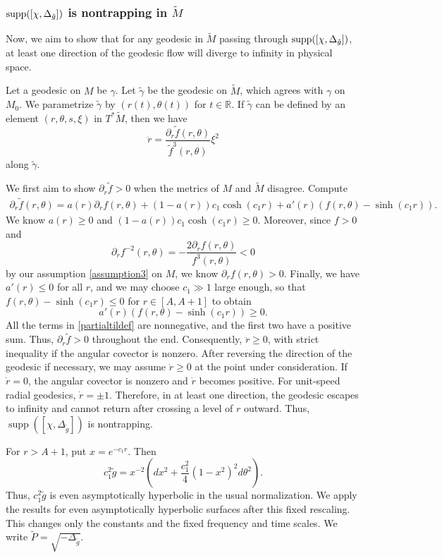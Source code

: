 \documentclass[11pt]{amsart}
\begin{document}
\subsubsection{$\textnormal{supp}([\chi,\Delta_{\tilde g}])$ is nontrapping in $\tilde M$} Now, we aim to show that for any geodesic in $\tilde M$ passing through $\textnormal{supp}([\chi,\Delta_{\tilde g}])$, at least one direction of the geodesic flow will diverge to infinity in physical space.

Let a geodesic on $M$ be $\gamma$. Let $\tilde\gamma$ be the geodesic on $\tilde M$, which agrees with $\gamma$ on $M_0$.  We parametrize $\tilde \gamma$  by $(r(t),\theta(t))$ for $t\in\mathbb{R}.$ If $\tilde \gamma$ can be defined by an element $(r,\theta,s,\xi)$ in $T^*\tilde M$, then we have $$\ddot{r}=\frac{\partial_r\tilde{f}(r,\theta)}{\tilde{f}^3(r,\theta)}\xi^2$$ along $\tilde \gamma.$

We first aim to show $\partial_r\tilde f>0$ when the metrics of $M$ and $\tilde M$ disagree. Compute
\begin{align}\label{partialtildef}
    \partial_r\tilde{f}(r,\theta)=a(r)\partial_rf(r,\theta)+(1-a(r))c_1\cosh(  c_1r)+a'(r)(f(r,\theta)-\sinh(  c_1r)).
\end{align}
We know $ a(r)\geq 0$ and $(1-a(r))    c_1\cosh(  c_1r)\geq 0$. Moreover, since  $f>0$ and $$\partial_rf^{-2}(r,\theta)=-\frac{2\partial_rf(r,\theta)}{f^3(r,\theta)}<0$$ by our assumption \eqref{assumption3} on $M$, we know $\partial_rf(r,\theta)>0.$ Finally, we have $a'(r)\leq 0$ for all $r$, and we may choose $c_1\gg1$ large enough, so that $f(r,\theta)-\sinh(c_1r)\leq 0$ for $r\in[A,A+1]$ to obtain $$a'(r)(f(r,\theta)-\sinh(c_1r))\geq0.$$ All the terms in \eqref{partialtildef} are nonnegative, and the first two have a positive sum. Thus, $\partial_r\tilde f>0$ throughout the end. Consequently, $\ddot r\geq0$, with strict inequality if the angular covector is nonzero. After reversing the direction of the geodesic if necessary, we may assume $\dot r\geq0$ at the point under consideration. If $\dot r=0$, the angular covector is nonzero and $\dot r$ becomes positive. For unit-speed radial geodesics, $\dot r=\pm1$. Therefore, in at least one direction, the geodesic escapes to infinity and cannot return after crossing a level of $r$ outward. Thus, $\operatorname{supp}([\chi,\Delta_{\tilde g}])$ is nontrapping.

For $r>A+1$, put $x=e^{-c_1r}$. Then
\[
c_1^2\tilde g=x^{-2}\left(dx^2+\frac{c_1^2}{4}(1-x^2)^2d\theta^2\right).
\]
Thus, $c_1^2\tilde g$ is even asymptotically hyperbolic in the usual normalization. We apply the results for even asymptotically hyperbolic surfaces after this fixed rescaling. This changes only the constants and the fixed frequency and time scales. We write $\tilde P=\sqrt{-\Delta_{\tilde g}}$.
\end{document}
